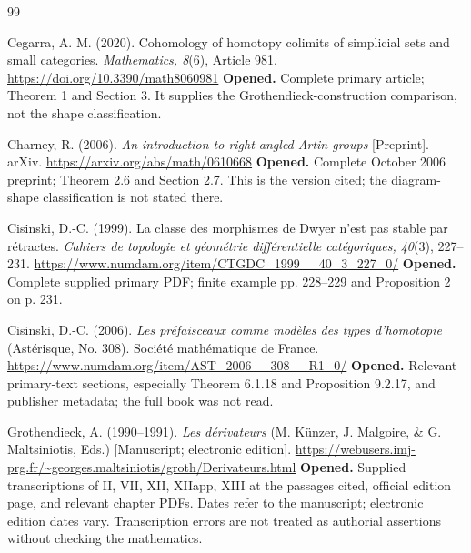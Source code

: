 \documentclass[11pt,a4paper]{article}
\theoremstyle{definition}
\theoremstyle{remark}
\begin{document}
\begin{thebibliography}{99}
\raggedright
{}
Cegarra, A. M. (2020). Cohomology of homotopy colimits of simplicial sets and small categories. \emph{Mathematics, 8}(6), Article 981. \url{https://doi.org/10.3390/math8060981}
\newline\textbf{Opened.} Complete primary article; Theorem 1 and Section 3. It supplies the Grothendieck-construction comparison, not the shape classification.

Charney, R. (2006). \emph{An introduction to right-angled Artin groups} [Preprint]. arXiv. \url{https://arxiv.org/abs/math/0610668}
\newline\textbf{Opened.} Complete October 2006 preprint; Theorem 2.6 and Section 2.7. This is the version cited; the diagram-shape classification is not stated there.

Cisinski, D.-C. (1999). La classe des morphismes de Dwyer n'est pas stable par r\'etractes. \emph{Cahiers de topologie et g\'eom\'etrie diff\'erentielle cat\'egoriques, 40}(3), 227--231. \url{https://www.numdam.org/item/CTGDC_1999__40_3_227_0/}
\newline\textbf{Opened.} Complete supplied primary PDF; finite example pp. 228--229 and Proposition 2 on p. 231.

Cisinski, D.-C. (2006). \emph{Les pr\'efaisceaux comme mod\`eles des types d'homotopie} (Ast\'erisque, No. 308). Soci\'et\'e math\'ematique de France. \url{https://www.numdam.org/item/AST_2006__308__R1_0/}
\newline\textbf{Opened.} Relevant primary-text sections, especially Theorem 6.1.18 and Proposition 9.2.17, and publisher metadata; the full book was not read.

Grothendieck, A. (1990--1991). \emph{Les d\'erivateurs} (M. K\"unzer, J. Malgoire, \& G. Maltsiniotis, Eds.) [Manuscript; electronic edition]. \url{https://webusers.imj-prg.fr/~georges.maltsiniotis/groth/Derivateurs.html}
\newline\textbf{Opened.} Supplied transcriptions of II, VII, XII, XIIapp, XIII at the passages cited, official edition page, and relevant chapter PDFs. Dates refer to the manuscript; electronic edition dates vary. Transcription errors are not treated as authorial assertions without checking the mathematics.


\end{thebibliography}
\end{document}
